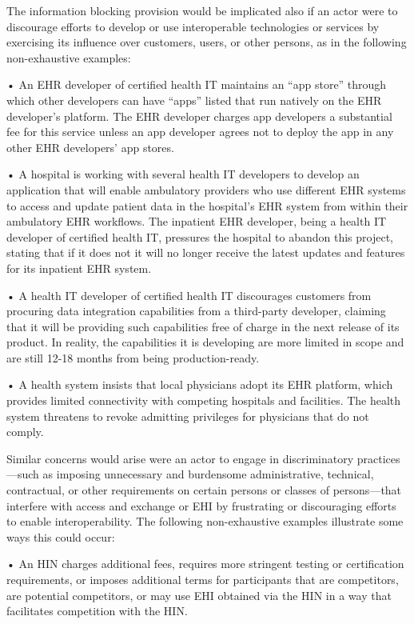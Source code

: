 \documentclass[twoside,11pt]{article}
\begin{document}
          The information blocking provision would be implicated also if an actor were to discourage efforts to develop or use interoperable technologies or services by exercising its influence over customers, users, or other persons, as in the following non-exhaustive examples:


          • An EHR developer of certified health IT maintains an “app store” through which other developers can have “apps” listed that run natively on the EHR developer's platform. The EHR developer charges app developers a substantial fee for this service unless an app developer agrees not to deploy the app in any other EHR developers' app stores.


          • A hospital is working with several health IT developers to develop an application that will enable ambulatory providers who use different EHR systems to access and update patient data in the hospital's EHR system from within their ambulatory EHR workflows. The inpatient EHR developer, being a health IT developer of certified health IT, pressures the hospital to abandon this project, stating that if it does not it will no longer receive the latest updates and features for its inpatient EHR system.


          • A health IT developer of certified health IT discourages customers from procuring data integration capabilities from a third-party developer, claiming that it will be providing such capabilities free of charge in the next release of its product. In reality, the capabilities it is developing are more limited in scope and are still 12-18 months from being production-ready.


          • A health system insists that local physicians adopt its EHR platform, which provides limited connectivity with competing hospitals and facilities. The health system threatens to revoke admitting privileges for physicians that do not comply.


          Similar concerns would arise were an actor to engage in discriminatory practices—such as imposing unnecessary and burdensome administrative, technical, contractual, or other requirements on certain persons or classes of persons—that interfere with access and exchange or EHI by frustrating or discouraging efforts to enable interoperability. The following non-exhaustive examples illustrate some ways this could occur:


          • An HIN charges additional fees, requires more stringent testing or certification requirements, or imposes additional terms for participants that are competitors, are potential competitors, or may use EHI obtained via the HIN in a way that facilitates competition with the HIN.
\end{document}
